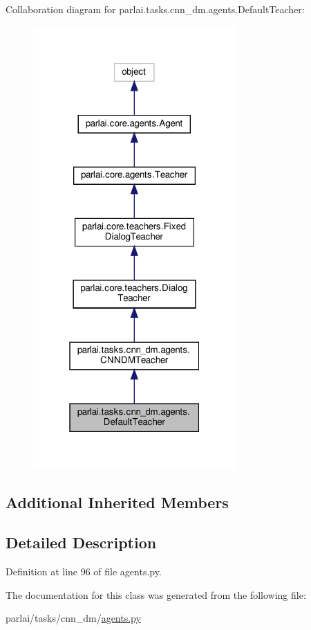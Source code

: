 Collaboration diagram for parlai.\+tasks.\+cnn\+\_\+dm.\+agents.\+Default\+Teacher\+:
\nopagebreak
\begin{figure}[H]
\begin{center}
\leavevmode
\includegraphics[width=220pt]{classparlai_1_1tasks_1_1cnn__dm_1_1agents_1_1DefaultTeacher__coll__graph}
\end{center}
\end{figure}
\subsection*{Additional Inherited Members}


\subsection{Detailed Description}


Definition at line 96 of file agents.\+py.



The documentation for this class was generated from the following file\+:\begin{DoxyCompactItemize}
\item 
parlai/tasks/cnn\+\_\+dm/\hyperlink{parlai_2tasks_2cnn__dm_2agents_8py}{agents.\+py}\end{DoxyCompactItemize}

